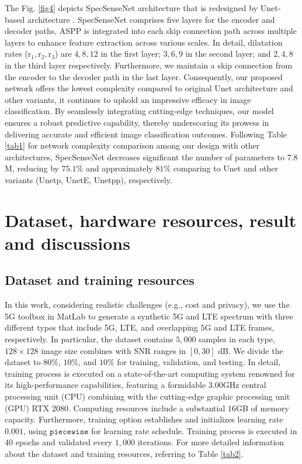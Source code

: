 \documentclass[journal]{IEEEtran} %
\begin{document}
The Fig. \ref{fig4} depicts SpecSenseNet architecture that is redesigned by Unet-based architecture \cite{ronneberger2015u}. SpecSenseNet comprises five layers for the encoder and decoder paths, ASPP is integrated into each skip connection path across multiple layers to enhance feature extraction across various scales. In detail, dilatation rates ($\mathrm{r_1, r_2, r_3}$) are $4, 8, 12$ in the first layer; $3, 6, 9$ in the second layer; and $2, 4, 8$ in the third layer respectively. Furthermore, we maintain a skip connection from the encoder to the decoder path in the last layer. Consequently, our proposed network offers the lowest complexity compared to original Unet architecture and other variants, it continues to uphold an impressive efficacy in image classification. By seamlessly integrating cutting-edge techniques, our model ensures a robust predictive capability, thereby underscoring its prowess in delivering accurate and efficient image classification outcomes. Following Table \ref{tab1} for network complexity comparison among our design with other architectures, SpecSenseNet decreases significant the number of parameters to $7.8$M, reducing by $75.1\%$ and approximately $81\%$ comparing to Unet and other variants (Unetp, UnetE, Unetpp), respectively. 


\section{Dataset, hardware resources, result and discussions}
\subsection{Dataset and training resources}
In this work, considering realistic challenges (e.g., cost and privacy), we use the 5G toolbox in MatLab to generate a synthetic 5G and LTE spectrum with three different types that include 5G, LTE, and overlapping 5G and LTE frames, respectively. In particular, the dataset contains $5,000$ samples in each type, $128 \times 128$ image size combines with SNR ranges in $[0, 30]$ dB. We divide the dataset to $80\%$, $10\%$, and $10\%$ for training, validation, and testing. In detail, training process is executed on a state-of-the-art computing system renowned for its high-performance capabilities, featuring a formidable $3.00$GHz central processing unit (CPU) combining with the cutting-edge graphic processing unit (GPU) RTX $2080$. Computing resources include a substantial $16$GB of memory capacity. Furthermore, training option establishes and initializes learning rate $0.001$, using $\mathtt{piecewise}$ for learning rate schedule. Training process is executed in $40$ epochs and validated every $1,000$ iterations. For more detailed information about the dataset and training resources, referring to Table \ref{tab2}.
\end{document}
